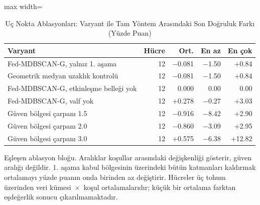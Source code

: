 \begin{table}[!t]
\centering\footnotesize
\setlength{\tabcolsep}{4pt}
\caption{Uç Nokta Ablasyonları: Varyant ile Tam Yöntem Arasındaki Son Doğruluk Farkı (Yüzde Puan)}\label{tab:ablation}
\begin{adjustbox}{max width=\columnwidth}
\begin{tabular}{lrrrr}
\toprule
Varyant & Hücre & Ort. & En az & En çok \\
\midrule
Fed-MDBSCAN-G, yalnız 1. aşama & 12 & $-$0.081 & $-$1.50 & $+$0.84 \\
Geometrik medyan uzaklık kontrolü & 12 & $-$0.081 & $-$1.50 & $+$0.84 \\
Fed-MDBSCAN-G, etkinleşme belleği yok & 12 & 0.000 & 0.00 & 0.00 \\
Fed-MDBSCAN-G, valf yok & 12 & $+$0.278 & $-$0.27 & $+$3.03 \\
Güven bölgesi çarpanı 1.5 & 12 & $-$0.916 & $-$8.42 & $+$2.90 \\
Güven bölgesi çarpanı 2.0 & 12 & $-$0.860 & $-$3.09 & $+$2.95 \\
Güven bölgesi çarpanı 3.0 & 12 & $+$0.575 & $-$6.38 & $+$12.82 \\
\bottomrule
\end{tabular}
\end{adjustbox}

\par\vspace{3pt}\parbox{\linewidth}{\footnotesize Eşleşen ablasyon bloğu. Aralıklar koşullar arasındaki değişkenliği gösterir, güven aralığı değildir. 1. aşama kabul bölgesinin üzerindeki bütün katmanları kaldırmak ortalamayı yüzde puanın onda birinden az değiştirir. Hücreler üç tohum üzerinden veri kümesi~$\times$~koşul ortalamalarıdır; küçük bir ortalama farktan eşdeğerlik sonucu çıkarılmamaktadır.}
\end{table}
